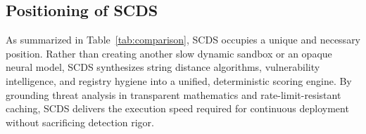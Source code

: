 \subsection{Positioning of SCDS}
As summarized in Table~\ref{tab:comparison}, SCDS occupies a unique and necessary position. Rather than creating another slow dynamic sandbox or an opaque neural model, SCDS synthesizes string distance algorithms, vulnerability intelligence, and registry hygiene into a unified, deterministic scoring engine. By grounding threat analysis in transparent mathematics and rate-limit-resistant caching, SCDS delivers the execution speed required for continuous deployment without sacrificing detection rigor.
